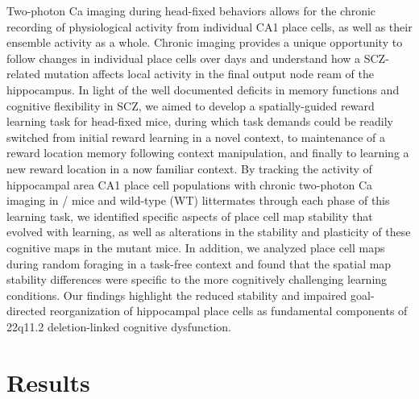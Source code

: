 Two-photon Ca imaging during head-fixed behaviors \citep{Danielson2016b}\citep{Dombeck2010} allows for the chronic recording of physiological activity from individual CA1 place cells, as well as their ensemble activity as a whole. Chronic imaging provides a unique opportunity to follow changes in individual place cells over days and understand how a SCZ-related mutation affects local activity in the final output node ream of the hippocampus. In light of the well documented deficits in memory functions and cognitive flexibility in SCZ, we aimed to develop a spatially-guided reward learning task for head-fixed mice, during which task demands could be readily switched from initial reward learning in a novel context, to maintenance of a reward location memory following context manipulation, and finally to learning a new reward location in a now familiar context. By tracking the activity of hippocampal area CA1 place cell populations with chronic two-photon Ca imaging in \df/ mice and wild-type (WT) littermates through each phase of this learning task, we identified specific aspects of place cell map stability that evolved with learning, as well as alterations in the stability and plasticity of these cognitive maps in the mutant mice. In addition, we analyzed place cell maps during random foraging in a task-free context and found that the spatial map stability differences were specific to the more cognitively challenging learning conditions. Our findings highlight the reduced stability and impaired goal-directed reorganization of hippocampal place cells as fundamental components of 22q11.2 deletion-linked cognitive dysfunction.  

\section{Results}

